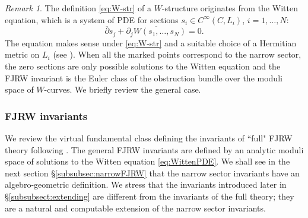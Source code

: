 \documentclass[11pt]{amsart}
\theoremstyle{definition} %
\theoremstyle{remark} %
\newtheorem{rem}[thm]{Remark}%
\newcommand{\nar}{\operatorname{nar}}
\newcommand{\ext}{{\operatorname{ext}}}
\newcommand{\ov}{\overline}
\begin{document}
\begin{rem} 
\label{rem:Wstr-origin} 
The definition \eqref{eq:W-str} of a $W$-structure 
originates from the Witten equation, 
which is a system of PDE for 
sections $s_i \in C^\infty(C,L_i)$, 
$i=1,\dots, N$: 
\begin{equation}\label{eq:WittenPDE}
\ov{\partial} s_j + \ov{\partial_j W(s_1,\dots,s_N)} = 0. 
\end{equation} 
The equation makes sense under \eqref{eq:W-str}  
and a suitable choice of a Hermitian metric on $L_i$ 
(see \cite{FJR:virt}). 
When all the marked points correspond to the narrow sector, 
the zero sections are only possible solutions to 
the Witten equation 
\cite[Theorem 3.3.8]{FJR:virt} 
and the FJRW invariant is the Euler class of the obstruction 
bundle over the moduli space of $W$-curves. We briefly review the general case.
\end{rem} 


\subsubsection{FJRW invariants} \label{subsubsect:fullFJRW}
We review the virtual fundamental class defining 
the invariants of ``full" FJRW theory following \cite{FJR1}. 
The general FJRW invariants are defined by an analytic moduli 
space of solutions to the Witten equation \eqref{eq:WittenPDE}. 
We shall see in the next section \S \ref{subsubsec:narrowFJRW} 
that the narrow sector invariants have an algebro-geometric definition. 
We stress that the invariants introduced later in \S \ref{subsubsect:extending} 
are different from the invariants of the full theory; they are a 
natural and computable extension of the narrow sector invariants. 

\end{document}
